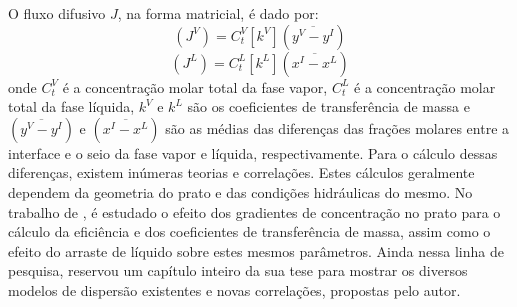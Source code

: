 \begin{enumerate}
O fluxo difusivo $J$, na forma matricial, é dado por:
\begin{equation}
\left( J^V\right)  = C_t^V \left[ k^V\right] \left( \overline{y^V-y^I}\right) 
\label{eq:diffusionvap}
\end{equation}
\begin{equation}
\left( J^L\right)  = C_t^L \left[ k^L\right] \left( \overline{x^I-x^L}\right) 
\label{eq:diffusionliq}
\end{equation}
onde $C_t^V$ é a concentração molar total da fase vapor, $C_t^L$ é a
concentração molar total da fase líquida, $k^V$ e $k^L$ são os coeficientes de transferência de massa e
$\left( \overline{y^V-y^I}\right)$ e $\left( \overline{x^I-x^L}\right)$ são as médias das diferenças das frações
molares entre a interface e o seio da fase vapor e líquida, respectivamente.
Para o cálculo dessas diferenças, existem inúmeras teorias e correlações. Estes
cálculos geralmente dependem da geometria do prato e das condições hidráulicas do mesmo. No trabalho de
, é estudado o efeito dos gradientes de concentração no prato para o cálculo da eficiência e dos
coeficientes de transferência de massa, assim como o efeito do arraste de líquido sobre estes mesmos parâmetros. Ainda
nessa linha de pesquisa,  reservou um capítulo inteiro da sua tese para mostrar os
diversos modelos de dispersão existentes e novas correlações, propostas pelo autor.



\end{enumerate}

